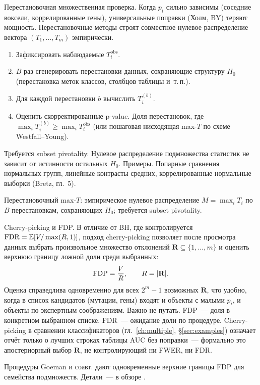 Перестановочная множественная проверка. Когда $p_i$ сильно зависимы (соседние воксели, коррелированные гены), универсальные поправки (Холм, BY) теряют мощность.
Перестановочные методы \citep{westfall2008} строят совместное нулевое распределение вектора $(T_1,\ldots,T_m)$ эмпирически.
\begin{enumerate}
    \item Зафиксировать наблюдаемые $T_i^{\text{obs}}$.
    \item $B$ раз сгенерировать перестановки данных, сохраняющие
          структуру $H_0$ (перестановка меток классов, столбцов таблицы и~т.\,п.).
    \item Для каждой перестановки $b$ вычислить $T_i^{(b)}$.
    \item Оценить скорректированные p-value. Доля перестановок, где
          $\max_i T_i^{(b)}\geq\max_i T_i^{\text{obs}}$ (или пошаговая нисходящая max-$T$ по схеме Westfall--Young).
\end{enumerate}
Требуется subset pivotality. Нулевое распределение подмножества статистик не зависит от истинности остальных $H_0$.
Примеры. Попарные сравнения нормальных групп, линейные контрасты средних, коррелированные нормальные выборки (Bretz, гл.~5).

Перестановочный max-$T$: эмпирическое нулевое распределение $M=\max_i T_i$ по $B$ перестановкам, сохраняющих $H_0$; требуется subset pivotality.

Cherry-picking и FDP. В отличие от BH, где контролируется $\operatorname{FDR}=\mathbb E[V/\max(R,1)]$, подход cherry-picking \citep{goeman2011} позволяет после просмотра данных выбрать произвольное множество отклонений $\mathbf{R}\subseteq\{1,\ldots,m\}$ и оценить верхнюю границу ложной доли среди выбранных:
\[ \operatorname{FDP} = \frac{V}{R},\qquad R=|\mathbf{R}|.
\]
Оценка справедлива одновременно для всех $2^m-1$ возможных $\mathbf{R}$, что удобно, когда в список кандидатов (мутации, гены) входят и объекты с малыми $p_i$, и объекты по экспертным соображениям.
Важно не путать. FDP~--- доля в конкретном выбранном списке. FDR~--- ожидание доли по процедуре.
Cherry-picking в сравнении классификаторов (гл.~\ref{ch:multiple}, \S\ref{sec:examples}) означает отчёт только о лучших строках таблицы AUC без поправки~--- формально это апостериорный выбор $\mathbf{R}$, не контролирующий ни FWER, ни FDR.

\begin{remark}
Процедуры Goeman и соавт. дают одновременные верхние границы FDP для семейства подмножеств. Детали~--- в обзоре \citet{goeman2014}.
\end{remark}


